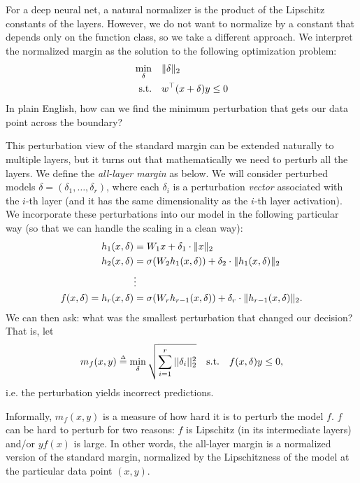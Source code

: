 For a deep neural net, a natural normalizer is the product of the Lipschitz constants of the layers. However, we do not want to normalize by a constant that depends only on the function class, so we take a different approach. We interpret the normalized margin as the solution to the following optimization problem:
\begin{equation}
    \begin{aligned}
        \min_\delta \quad & \|\delta\|_2 \\
        \textrm{s.t.} \quad & w^\top(x + \delta) y \leq 0
    \end{aligned}
\end{equation}
In plain English, how can we find the minimum perturbation that gets our data point across the boundary?

This perturbation view of the standard margin can be extended naturally to multiple layers, but it turns out that mathematically we need to perturb all the layers. We define the \textit{all-layer margin} as below. We will consider perturbed models $\delta = (\delta_1, \dots, \delta_r)$, where each $\delta_i$ is a perturbation \textit{vector} associated with the $i$-th layer (and it has the same dimensionality as the $i$-th layer activation). We incorporate these perturbations into our model in the following particular way (so that we can handle the scaling in a clean way):
\begin{align}
    h_1(x, \delta) &= W_1 x + \delta_1 \cdot \|x\|_2 \\
    h_2(x, \delta) &= \sigma(W_2 h_1(x, \delta)) + \delta_2 \cdot \|h_1(x, \delta)\|_2 \\
    &\vdots \nonumber \\
    f(x, \delta) = h_r(x, \delta) &= \sigma(W_r h_{r - 1}(x, \delta)) + \delta_r \cdot \|h_{r - 1}(x, \delta)\|_2.
\end{align}
We can then ask: what was the smallest perturbation that changed our decision? That is, let
\begin{align}
    m_f(x, y) \defeq \min_\delta \sqrt{\sum_{i=1}^r ||\delta_i||_2^2} \quad \text{s.t.} \quad f(x, \delta) y \leq 0,
\end{align}
i.e. the perturbation yields incorrect predictions.

Informally, $m_f(x, y)$ is a measure of how hard it is to perturb the model $f$. $f$ can be hard to perturb for two reasons: $f$ is Lipschitz (in its intermediate layers) and/or $yf(x)$ is large. In other words, the all-layer margin is a normalized version of the standard margin, normalized by the Lipschitzness of the model at the particular data point $(x,y)$.  %

